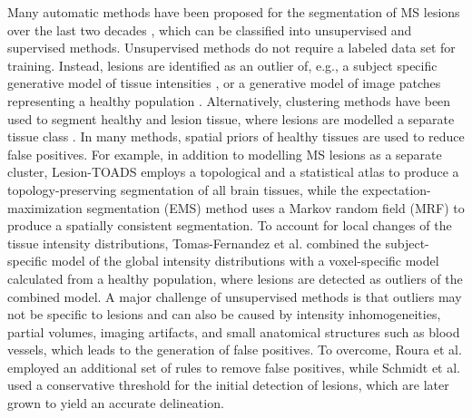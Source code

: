 Many automatic methods have been proposed for the segmentation of MS
\mbox{lesions} over the last two decades \cite{garcia2013review}, which can be
classified into unsupervised and supervised methods. Unsupervised methods do not
require a labeled data set for training. Instead, lesions are identified as an
outlier of, e.g., a subject specific generative model of tissue intensities
\cite{vanleemput2001,tomas2015,schmidt2012automated,roura2015}, or a generative
model of image patches representing a healthy population \cite{weiss2013}.
Alternatively, clustering methods have been used to segment healthy and lesion
tissue, where lesions are modelled a separate tissue class
\cite{shiee2010topology,sudre2015}.
In many methods, spatial priors of healthy tissues are used to reduce false
positives. For example, in addition to modelling MS lesions as a separate
cluster, Lesion-TOADS \cite{shiee2010topology} employs a topological and a
statistical atlas to produce a topology-preserving segmentation of all brain
tissues, while the expectation-maximization segmentation (EMS)
\cite{vanleemput2001} method uses a Markov random field (MRF) to produce a
spatially consistent segmentation.
To account for local changes of the tissue intensity distributions,
Tomas-Fernandez et al. \cite{tomas2015} combined the subject-specific model of
the global intensity distributions with a voxel-specific model calculated from a
healthy population, where lesions are detected as outliers of the combined
model. A major challenge of unsupervised methods is that outliers may not be
specific to lesions and can also be caused by intensity inhomogeneities, partial
volumes, imaging artifacts, and small anatomical structures such as blood
vessels, which leads to the generation of false positives. To overcome, Roura et
al. \cite{roura2015} employed an additional set of rules to remove false
positives, while Schmidt et al. \cite{schmidt2012automated} used a conservative
threshold for the initial detection of lesions, which are later grown to yield
an accurate delineation.




